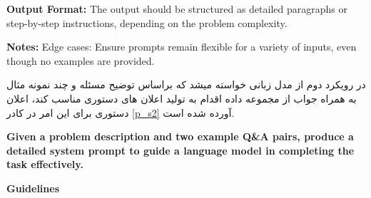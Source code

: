 \begin{tcolorbox}[breakable,colframe=mybluecolor!100, colback=mybluecolor!20, title=اعلان دستوری برای نمونه\/گیری براساس توضیح مسئله]
\begin{LTR}
	\textbf{Output Format:}  
	The output should be structured as detailed paragraphs or step-by-step instructions, depending on the problem complexity.
	
	\textbf{Notes:}  
	Edge cases: Ensure prompts remain flexible for a variety of inputs, even though no examples are provided.
\end{LTR}
	
\end{tcolorbox}

در رویکرد دوم از مدل زبانی خواسته می\/شد که براساس توضیح مسئله و چند نمونه مثال به همراه جواب از مجموعه داده اقدام به تولید اعلان های دستوری مناسب کند، اعلان دستوری برای این امر در کادر \ref{p_s2} آورده شده است.
\begin{tcolorbox}[breakable,colframe=mybluecolor!100, colback=mybluecolor!20, title=اعلان دستوری برای نمونه\/گیری براساس توضیح مسئله و چند نمونه مثال از مجموعه داده] \label{p_s2}
	\begin{LTR}
		
	
	\textbf{Given a problem description and two example Q\&A pairs, produce a detailed system prompt to guide a language model in completing the task effectively.}
	
	\textbf{Guidelines}
	

\end{LTR}
\end{tcolorbox}
